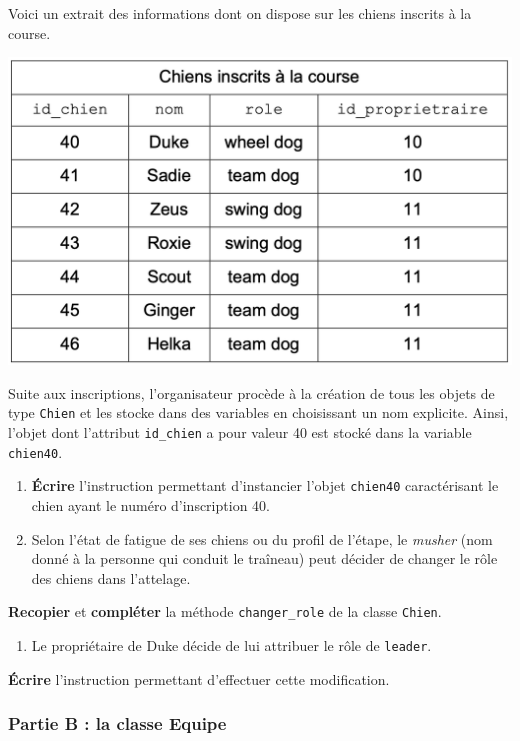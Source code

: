 Voici un extrait des informations dont on dispose sur les chiens
inscrits à la course.

\includegraphics{24-NSIJ1ME1-Ex3-01.png}

Suite aux inscriptions, l'organisateur procède à la création de tous les
objets de type \texttt{Chien} et les stocke dans des variables en
choisissant un nom explicite. Ainsi, l'objet dont l'attribut
\texttt{id\_chien} a pour valeur 40 est stocké dans la variable
\texttt{chien40}.

\begin{enumerate}
\def\labelenumi{\arabic{enumi}.}
\tightlist
\item
  \textbf{Écrire} l'instruction permettant d'instancier l'objet
  \texttt{chien40} caractérisant le chien ayant le numéro d'inscription
  40.
\item
  Selon l'état de fatigue de ses chiens ou du profil de l'étape, le
  \emph{musher} (nom donné à la personne qui conduit le traîneau) peut
  décider de changer le rôle des chiens dans l'attelage.
\end{enumerate}

\textbf{Recopier} et \textbf{compléter} la méthode
\texttt{changer\_role} de la classe \texttt{Chien}.

\begin{enumerate}
\def\labelenumi{\arabic{enumi}.}
\setcounter{enumi}{2}
\tightlist
\item
  Le propriétaire de Duke décide de lui attribuer le rôle de
  \texttt{\textquotesingle{}leader\textquotesingle{}}.
\end{enumerate}

\textbf{Écrire} l'instruction permettant d'effectuer cette modification.

\subsubsection{Partie B : la classe
Equipe}\label{partie-b-la-classe-equipe}


